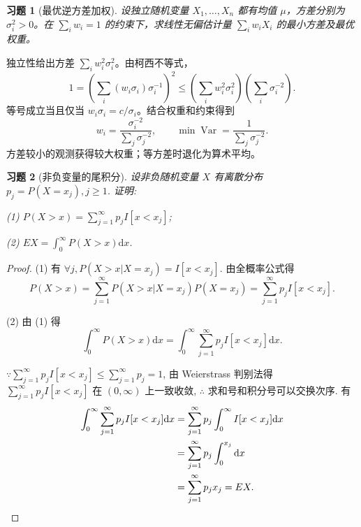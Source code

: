 \documentclass[12pt,fontset=fandol]{ctexart}
\newtheorem{exercise}{习题}[section]
\begin{document}
\begin{exercise}[最优逆方差加权]\label{q:A5.22}
设独立随机变量 $X_1,\ldots,X_n$ 都有均值 $\mu$，方差分别为 $\sigma_i^2>0$。在 $\sum_iw_i=1$ 的约束下，求线性无偏估计量 $\sum_iw_iX_i$ 的最小方差及最优权重。\par{}
\end{exercise}

\begin{solve}\label{a:A5.22}独立性给出方差 $\sum_iw_i^2\sigma_i^2$。由柯西不等式，\[1=\left(\sum_i(w_i\sigma_i)\sigma_i^{-1}\right)^2\le\left(\sum_iw_i^2\sigma_i^2\right)\left(\sum_i\sigma_i^{-2}\right).\]等号成立当且仅当 $w_i\sigma_i=c/\sigma_i$。结合权重和约束得到\[w_i=\frac{\sigma_i^{-2}}{\sum_j\sigma_j^{-2}},\qquad\min\operatorname{Var}=\frac{1}{\sum_j\sigma_j^{-2}}.\]方差较小的观测获得较大权重；等方差时退化为算术平均。\end{solve}

\begin{exercise}[非负变量的尾积分]\label{q:A5.25}
设非负随机变量 $X$ 有离散分布 $p_j=P(X=x_j),j\geq 1$. 证明:
    
    (1) $P(X>x)=\sum\limits_{j=1}^\infty p_jI[x<x_j]$;

    (2) $EX=\int_0^\infty P(X>x)\mathrm{d}x$.\par{}
\end{exercise}

\begin{proof}\label{a:A5.25}
    (1) 有 $\forall j,P(X>x|X=x_j)=I[x<x_j]$. 由全概率公式得
    \[P(X>x)=\sum\limits_{j=1}^\infty P(X>x|X=x_j)P(X=x_j)=\sum\limits_{j=1}^\infty p_jI[x<x_j].\]

    (2) 由 (1) 得
    \[\int_0^\infty P(X>x)\mathrm{d}x=\int_0^\infty\sum\limits_{j=1}^\infty p_jI[x<x_j]\mathrm{d}x.\]

    $\because\sum\limits_{j=1}^\infty p_jI[x<x_j]\leq\sum\limits_{j=1}^\infty p_j=1$, 由 Weierstrass 判别法得 $\sum\limits_{j=1}^\infty p_jI[x<x_j]$ 在 $(0,\infty)$ 上一致收敛, $\therefore$ 求和号和积分号可以交换次序. 有
    \begin{align*}
        \int_0^\infty\sum\limits_{j=1}^\infty p_jI[x<x_j]\mathrm{d}x & =\sum\limits_{j=1}^\infty p_j\int_0^\infty I[x<x_j]\mathrm{d}x \\
        & =\sum\limits_{j=1}^\infty p_j\int_0^{x_j}\mathrm{d}x \\
        & =\sum\limits_{j=1}^\infty p_jx_j=EX.\qedhere
    \end{align*}
\end{proof}
\end{document}
